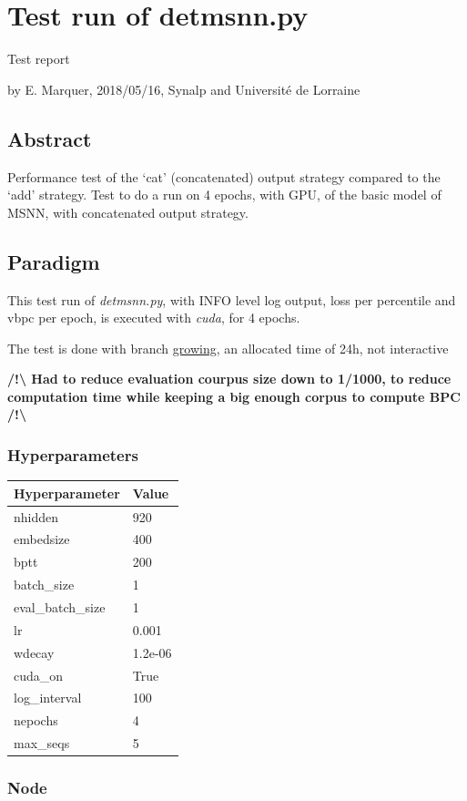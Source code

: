 \section*{Test run of detmsnn.py}

Test report

by E. Marquer, 2018/05/16, Synalp and Université de Lorraine

\subsection{Abstract}

Performance test of the `cat' (concatenated) output strategy compared to
the `add' strategy. Test to do a run on 4 epochs, with GPU, of the basic
model of MSNN, with concatenated output strategy.

\subsection{Paradigm}

This test run of \emph{detmsnn.py}, with INFO level log output, loss per
percentile and vbpc per epoch, is executed with \emph{cuda}, for 4
epochs.

The test is done with branch
\href{https://gitlab.inria.fr/emarquer/awd-lstm-lm/tree/growing}{growing},
an allocated time of 24h, not interactive

\textbf{/!\textbackslash{} Had to reduce evaluation courpus size down to
1/1000, to reduce computation time while keeping a big enough corpus to
compute BPC /!\textbackslash{}}

\newpage
\subsubsection{Hyperparameters}

\begin{longtable}[]{@{}ll@{}}
\hline
Hyperparameter & Value\tabularnewline
\hline
\endhead
nhidden & 920\tabularnewline
embedsize & 400\tabularnewline
bptt & 200\tabularnewline
batch\_size & 1\tabularnewline
eval\_batch\_size & 1\tabularnewline
lr & 0.001\tabularnewline
wdecay & 1.2e-06\tabularnewline
cuda\_on & True\tabularnewline
log\_interval & 100\tabularnewline
nepochs & 4\tabularnewline
max\_seqs & 5\tabularnewline
\hline
\end{longtable}

\subsubsection{Node}

